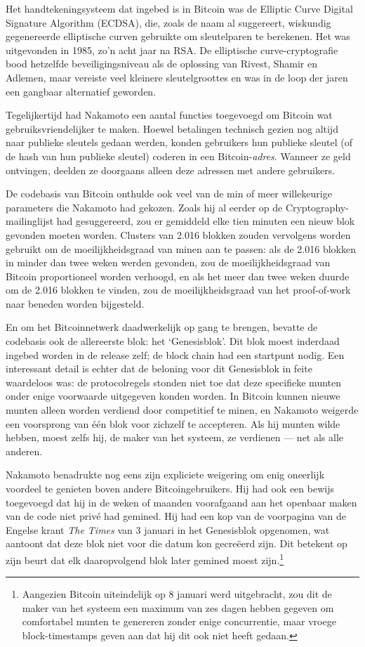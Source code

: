 \documentclass[smalldemyvopaper,11pt,twoside,onecolumn,openright,extrafontsizes,hidelinks]{memoir}
\begin{document}
Het handtekeningsysteem dat ingebed is in Bitcoin was de Elliptic Curve
Digital Signature Algorithm (ECDSA), die, zoals de naam al suggereert,
wiskundig gegenereerde elliptische curven gebruikte om sleutelparen te
berekenen. Het was uitgevonden in 1985, zo'n acht jaar na RSA. De
elliptische curve-cryptografie bood hetzelfde beveiligingsniveau als de
oplossing van Rivest, Shamir en Adlemen, maar vereiste veel kleinere
sleutelgroottes en was in de loop der jaren een gangbaar alternatief
geworden.

Tegelijkertijd had Nakamoto een aantal functies toegevoegd om Bitcoin
wat gebruiksvriendelijker te maken. Hoewel betalingen technisch gezien
nog altijd naar publieke sleutels gedaan werden, konden gebruikers hun
publieke sleutel (of de hash van hun publieke sleutel) coderen in een
Bitcoin-\emph{adres}. Wanneer ze geld ontvingen, deelden ze doorgaans
alleen deze adressen met andere gebruikers.

De codebasis van Bitcoin onthulde ook veel van de min of meer
willekeurige parameters die Nakamoto had gekozen. Zoals hij al eerder op
de Cryptography-mailinglijst had gesuggereerd, zou er gemiddeld elke
tien minuten een nieuw blok gevonden moeten worden. Clusters van 2.016
blokken zouden vervolgens worden gebruikt om de moeilijkheidsgraad van
minen aan te passen: als de 2.016 blokken in minder dan twee weken
werden gevonden, zou de moeilijkheidsgraad van Bitcoin proportioneel
worden verhoogd, en als het meer dan twee weken duurde om de 2.016
blokken te vinden, zou de moeilijkheidsgraad van het proof-of-work naar
beneden worden bijgesteld.

En om het Bitcoinnetwerk daadwerkelijk op gang te brengen, bevatte de
codebasis ook de allereerste blok: het `Genesisblok'. Dit blok moest
inderdaad ingebed worden in de release zelf; de block chain had een
startpunt nodig. Een interessant detail is echter dat de beloning voor
dit Genesisblok in feite waardeloos was: de protocolregels stonden niet
toe dat deze specifieke munten onder enige voorwaarde uitgegeven konden
worden. In Bitcoin kunnen nieuwe munten alleen worden verdiend door
competitief te minen, en Nakamoto weigerde een voorsprong van één blok
voor zichzelf te accepteren. Als hij munten wilde hebben, moest zelfs
hij, de maker van het systeem, ze verdienen --- net als alle anderen.

Nakamoto benadrukte nog eens zijn expliciete weigering om enig oneerlijk
voordeel te genieten boven andere Bitcoingebruikers. Hij had ook een
bewijs toegevoegd dat hij in de weken of maanden voorafgaand aan het
openbaar maken van de code niet privé had gemined. Hij had een kop van
de voorpagina van de Engelse krant \emph{The Times} van 3 januari in het
Genesisblok opgenomen, wat aantoont dat deze blok niet voor die datum
kon gecreëerd zijn. Dit betekent op zijn beurt dat elk daaropvolgend
blok later gemined moest zijn.\footnote{Aangezien Bitcoin uiteindelijk
  op 8 januari werd uitgebracht, zou dit de maker van het systeem een
  maximum van zes dagen hebben gegeven om comfortabel munten te
  genereren zonder enige concurrentie, maar vroege block-timestamps
  geven aan dat hij dit ook niet heeft gedaan.}
\end{document}
